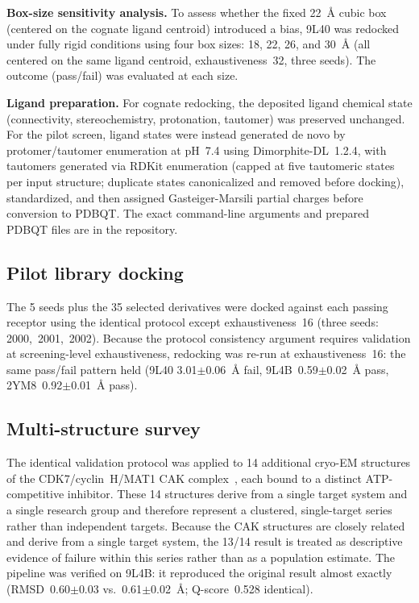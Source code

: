\documentclass[global,twocolumn]{svjour}
\begin{document}
\textbf{Box-size sensitivity analysis.} To assess whether the fixed 22~\AA{}
cubic box (centered on the cognate ligand centroid) introduced a bias, 9L40
was redocked under fully rigid conditions using four box sizes: 18, 22, 26,
and 30~\AA{} (all centered on the same ligand centroid, exhaustiveness~32,
three seeds). The outcome (pass/fail) was evaluated at each size.

\textbf{Ligand preparation.} For cognate redocking, the deposited ligand
chemical state (connectivity, stereochemistry, protonation, tautomer) was
preserved unchanged. For the pilot screen, ligand states were instead generated
de novo by protomer/tautomer enumeration at pH~7.4 using Dimorphite-DL~1.2.4,
with tautomers generated via RDKit enumeration (capped at five tautomeric
states per input structure; duplicate states canonicalized and removed before
docking), standardized, and then assigned Gasteiger-Marsili partial charges
before conversion to PDBQT. The exact command-line arguments and prepared
PDBQT files are in the repository.

\subsection{Pilot library docking}

The 5 seeds plus the 35 selected derivatives were docked against each
passing receptor using the identical protocol except exhaustiveness~16 (three
seeds: 2000,~2001,~2002). Because the protocol consistency argument requires
validation at screening-level exhaustiveness, redocking was re-run at
exhaustiveness~16: the same pass/fail pattern held (9L40
3.01$\pm$0.06~\AA{} fail, 9L4B~0.59$\pm$0.02~\AA{} pass,
2YM8~0.92$\pm$0.01~\AA{} pass).

\subsection{Multi-structure survey}

The identical validation protocol was applied to 14 additional cryo-EM
structures of the CDK7/cyclin~H/MAT1 CAK complex~\cite{cushing2024}, each
bound to a distinct ATP-competitive inhibitor. These 14 structures derive
from a single target system and a single research group and therefore
represent a clustered, single-target series rather than independent targets.
Because the CAK structures are closely related and derive from a single target
system, the 13/14 result is treated as descriptive evidence of failure within
this series rather than as a population estimate. The pipeline was verified on
9L4B: it reproduced the original result almost exactly (RMSD~0.60$\pm$0.03
vs.~0.61$\pm$0.02~\AA{}; Q-score~0.528 identical).
\end{document}

